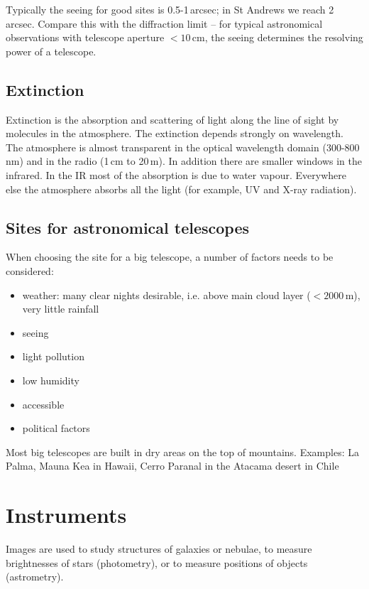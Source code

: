 Typically the seeing for good sites is 0.5-1\,arcsec; in St Andrews we reach 2\,arcsec. Compare this with the diffraction limit -- for typical astronomical observations with telescope aperture $\lt 10$\,cm, the seeing determines the resolving power of a telescope.

\subsection{Extinction}

Extinction is the absorption and scattering of light along the line of sight by molecules in the atmosphere. The extinction depends strongly on wavelength. The atmosphere is almost transparent in the optical wavelength domain (300-800\,nm) and in the radio (1\,cm to 20\,m). In addition there are smaller windows in the infrared. In the IR most of the absorption is due to water vapour. Everywhere else the atmosphere absorbs all the light (for example, UV and X-ray radiation).  

\subsection{Sites for astronomical telescopes}

When choosing the site for a big telescope, a number of factors needs to be considered:

\begin{itemize}
\item{weather: many clear nights desirable, i.e. above main cloud layer ($\lt 2000$\,m), very little rainfall}
\item{seeing}
\item{light pollution}
\item{low humidity}
\item{accessible}
\item{political factors}
\end{itemize}

Most big telescopes are built in dry areas on the top of mountains. Examples: La Palma, Mauna Kea in Hawaii, Cerro Paranal in the Atacama desert in Chile

\section{Instruments}

Images are used to study structures of galaxies or nebulae, to measure brightnesses of stars (photometry), or to measure positions of objects (astrometry).

